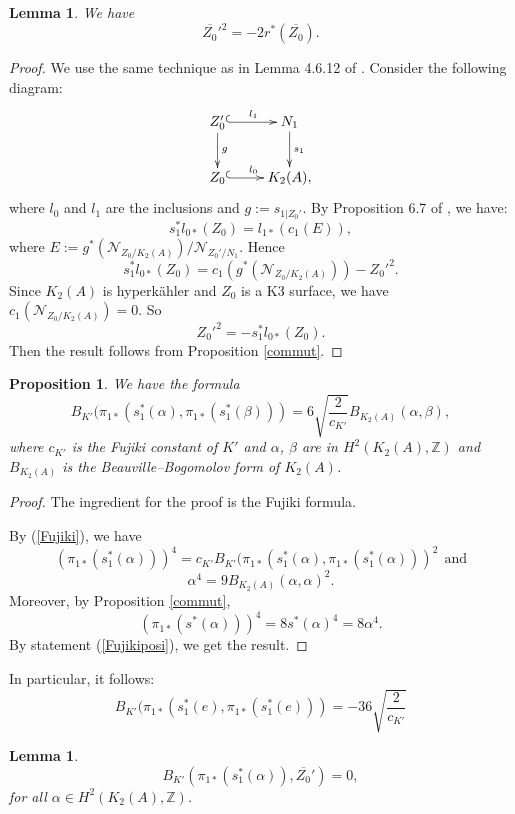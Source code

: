 \documentclass{alggeom}
\newcommand{\kum}[2]{K_{ #2 }( #1 )}
\newcommand{\X}{\kum{A}{2}}
\newcommand{\Z}{\mathbb{Z}}
\theoremstyle{plain}
\newtheorem{lemme}[theorem]{Lemma}
\newtheorem{prop}[theorem]{Proposition}
\theoremstyle{definition}
\theoremstyle{remark}
\begin{document}
\begin{lemme}\label{Zinter}
We have $$\overline{Z_{0}}'^{2}=-2r^{*}(\overline{Z_{0}}).$$
\end{lemme}
\begin{proof}
We use the same technique as in Lemma 4.6.12 of \cite{Lol}.
Consider the following diagram:
$$\xymatrix{
Z_{0}' \ar[d]^{g}\ar@{^{(}->}[r]^{l_{1}}& N_{1} \ar[d]^{s_{1}}\\
   Z_{0} \ar@{^{(}->}[r]^{l_{0}}  & K_{2}(A),
   }$$
where $l_{0}$ and $l_{1}$ are the inclusions and $g:=s_{1|Z_0'}$.
By Proposition 6.7 of \cite{Fulton}, we have:
$$s_{1}^{*}l_{0*}(Z_{0})=l_{1*}(c_{1}(E)),$$
where $E:=g^{*}(\mathscr{N}_{Z_{0}/K_{2}(A)})/\mathscr{N}_{Z_{0}'/N_{1}}$.
Hence $$s_{1}^{*}l_{0*}(Z_{0})=c_{1}(g^{*}(\mathscr{N}_{Z_{0}/K_{2}(A)}))-Z_{0}'^{2}.$$
Since $K_{2}(A)$ is hyperk\"ahler and $Z_{0}$ is a K3 surface, we have $c_{1}(\mathscr{N}_{Z_{0}/K_{2}(A)})=0$.
So
$$Z_{0}'^{2}=-s_{1}^{*}l_{0*}(Z_{0}).$$
Then the result follows from Proposition \ref{commut}.
\end{proof}
\begin{prop}\label{passage}
We have the formula $$B_{K'}(\pi_{1*}(s_{1}^{*}(\alpha),\pi_{1*}(s_{1}^{*}(\beta)))=6\sqrt{\frac{2}{c_{K'}}}B_{K_2(A)}(\alpha,\beta),$$
where $c_{K'}$ is the Fujiki constant of $K'$ and $\alpha$, $\beta$ are in $H^{2}(K_2(A),\Z)$ and $B_{K_2(A)}$ is the Beauville--Bogomolov form of $K_2(A)$.
\end{prop} 
\begin{proof}
The ingredient for the proof is the Fujiki formula.

By (\ref{Fujiki}), we have $$(\pi_{1*}(s_{1}^{*}(\alpha)))^{4}=c_{K'}B_{K'}(\pi_{1*}(s_{1}^{*}(\alpha),\pi_{1*}(s_{1}^{*}(\alpha)))^{2}\ \ \text{and}$$
$$\alpha^{4}=9B_{K_2(A)}(\alpha,\alpha)^{2}.$$
Moreover, by Proposition \ref{commut}, $$(\pi_{1*}(s^{*}(\alpha)))^{4}=8s^{*}(\alpha)^{4}=8\alpha^{4}.$$
By statement (\ref{Fujikiposi}), we get the result.
\end{proof}
In particular, it follows:
\begin{equation}
B_{K'}(\pi_{1*}(s_{1}^{*}(e),\pi_{1*}(s_{1}^{*}(e)))=-36\sqrt{\frac{2}{c_{K'}}}
\label{deltahaha}
\end{equation}
\begin{lemme}\label{ortho}
$$B_{K'}(\pi_{1*}(s_{1}^{*}(\alpha)),\overline{Z_0}')=0,$$
for all $\alpha\in H^{2}(\X,\Z)$.
\end{lemme}
\end{document}
